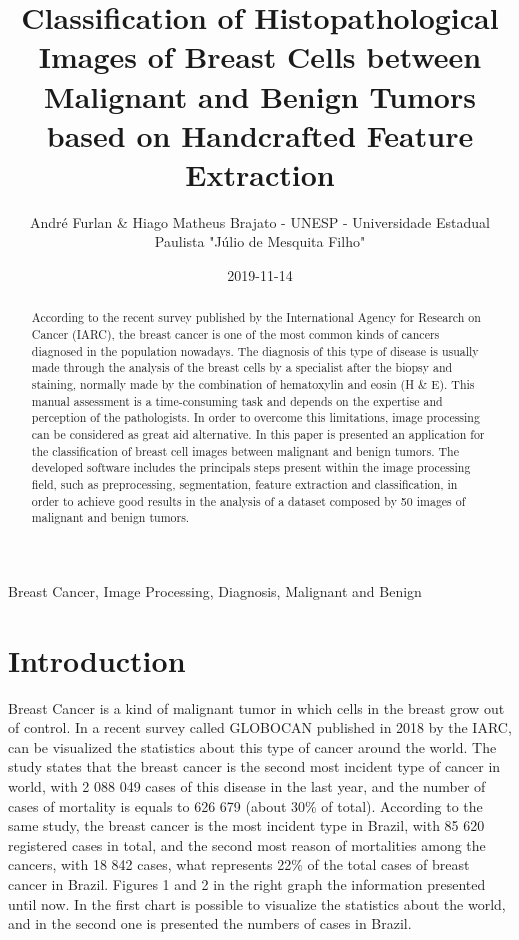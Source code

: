 \documentclass[conference]{IEEEtran}
\begin{document}
\title{Classification of Histopathological Images of Breast Cells between Malignant and Benign Tumors based on Handcrafted Feature Extraction}
\author{André Furlan \& Hiago Matheus Brajato - UNESP - Universidade Estadual Paulista "Júlio de Mesquita Filho"}
\date{2019-11-14}
\maketitle

\begin{abstract}
According to the recent survey published by the International Agency for Research on Cancer (IARC), the breast cancer is one of the most common kinds of cancers diagnosed in the population nowadays. The diagnosis of this type of disease is usually made through the analysis of the breast cells by a specialist after the biopsy and staining, normally made by the combination of hematoxylin and eosin (H \& E). This manual assessment is a time-consuming task and depends on the expertise and perception of the pathologists. In order to overcome this limitations, image processing can be considered as great aid alternative. In this paper is presented an application for the classification of breast cell images between malignant and benign tumors. The developed software includes the principals steps present within the image processing field, such as preprocessing, segmentation, feature extraction and classification, in order to achieve good results in the analysis of a dataset composed by 50 images of malignant and benign tumors.
\end{abstract}

\begin{IEEEkeywords}
Breast Cancer, Image Processing, Diagnosis, Malignant and Benign
\end{IEEEkeywords}

\section{Introduction}
Breast Cancer is a kind of malignant tumor in which cells in the breast grow out of control. In a recent survey called GLOBOCAN \cite{GLOBOCAN} published in 2018 by the IARC, can be visualized the statistics about this type of cancer around the world. The study states that the breast cancer is the second most incident type of cancer in world, with 2 088 049 cases of this disease in the last year, and the number of cases of mortality is equals to 626 679 (about 30\% of total). According to the same study, the breast cancer is the most incident type in Brazil, with 85 620 registered cases in total, and the second most reason of mortalities among the cancers, with 18 842 cases, what represents 22\% of the total cases of breast cancer in Brazil. Figures 1 and 2 in the right graph the information presented until now. In the first chart is possible to visualize the statistics about the world, and in the second one is presented the numbers of cases in Brazil.
\end{document}
